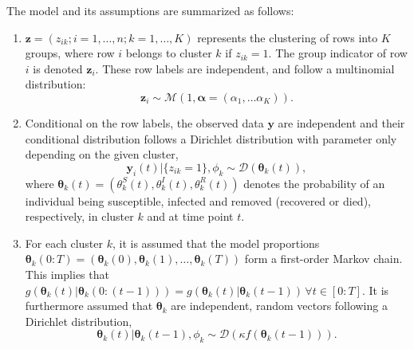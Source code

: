 \documentclass[10pt,a4paper]{article}
\begin{document}
The model and its assumptions are summarized as follows: 

\begin{enumerate}
	
	\item $\mathbf{z} = (z_{ik}; i = 1, \ldots, n; k = 1, \ldots, K)$ represents the clustering of rows into $K$ groups, where row $i$ belongs to cluster $k$ if $z_{ik} = 1$. The group indicator of row $i$ is denoted $\mathbf{z}_i$. These row labels are independent, and follow a multinomial distribution:
	$$
	\mathbf{z}_i \sim \mathcal{M}(1, \boldsymbol{\alpha} = (\alpha_1, \ldots \alpha_K)).
	$$
	
	\item Conditional on the row labels, the observed data $\mathbf{y}$ are independent and their conditional distribution follows a Dirichlet distribution with parameter only depending on the given cluster,
	\begin{equation}\label{obsprocess}
		\mathbf{y}_{i}(t) | \{z_{ik} = 1\}, \phi_k \sim \mathcal{D}( \boldsymbol{\theta}_{k}(t)),
	\end{equation}
	where $\boldsymbol{\theta}_{k}(t) = (\theta_{k}^S(t), \theta_{k}^I(t), \theta_{k}^R(t))$ denotes the probability of an individual being susceptible, infected and removed (recovered or died), respectively, in cluster $k$ and at time point $t$.
	
	\item For each cluster $k$, it is assumed that the model proportions 
	$
	\boldsymbol{\theta}_{k}(0:T) = (\boldsymbol{\theta}_k(0), \boldsymbol{\theta}_k(1), \ldots, \boldsymbol{\theta}_k(T))
	$
	form a first-order Markov chain. This implies that 
	$
	g(\boldsymbol{\theta}_k(t)|\boldsymbol{\theta}_{k}(0:(t-1))) = g(\boldsymbol{\theta}_k(t)|\boldsymbol{\theta}_{k}(t-1)) \, \forall t \in [0:T]. 
	$
	It is furthermore assumed that $\boldsymbol{\theta}_{k}$ are independent, random vectors following a Dirichlet distribution, 
	\begin{equation}\label{latentprocess}
	\boldsymbol{\theta}_{k}(t)|\boldsymbol{\theta}_{k}(t-1), \phi_k \sim \mathcal{D}(\kappa f(\boldsymbol{\theta}_{k}(t-1))).
	\end{equation}


\end{enumerate}
\end{document}
